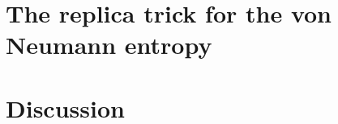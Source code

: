 \documentclass[11pt,oneside]{article}
\newcommand{\la}{\langle}
\let\la=\label \let\ci=\cite \let\re=\ref
\numberwithin{equation}{section}
\def \la {\label}   %
\begin{document}


 
\section{The replica trick for the von Neumann entropy}







 







\section{Discussion}
\la{sec:Conclusions} 



\appendix









\small

%
 
\end{document}
